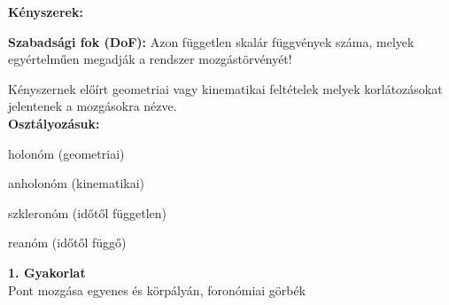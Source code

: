 \newpage
\textbf{Kényszerek:}
\begin{tcolorbox}[colback=MidnightBlue!5!white,colframe=MidnightBlue!60!black,title= Definíció]
    \textbf{Szabadsági fok (DoF):} Azon független skalár függvények száma, melyek egyértelműen megadják a rendszer mozgástörvényét!
    \end{tcolorbox}
\begin{tcolorbox}[colback=MidnightBlue!5!white,colframe=MidnightBlue!60!black,title= Definíció]
    Kényszernek előírt geometriai vagy kinematikai feltételek melyek korlátozásokat jelentenek a mozgásokra nézve.\\
    \textbf{Osztályozásuk:}
    \begin{itemize}
        \begin{multicols}{2}
        \item holonóm (geometriai)
        \item anholonóm (kinematikai)
        
        \columnbreak
        \item szkleronóm (időtől független)
        \item reanóm (időtől függő)
        \end{multicols}
    \end{itemize}
\end{tcolorbox}
\newpage
\begin{center}
    \large \textbf{1. Gyakorlat}\\
    Pont mozgása egyenes és körpályán, foronómiai görbék
\end{center}